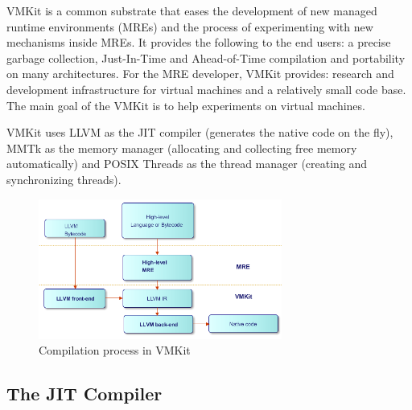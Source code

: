 

\label{sec:concurrency}
VMKit is a common substrate that eases the development of new managed runtime environments (MREs) and the process of experimenting with new mechanisms inside MREs.
It provides the following to the end users: a precise garbage collection, Just-In-Time and Ahead-of-Time compilation and portability on many architectures. For the MRE developer, VMKit provides: research and development infrastructure for virtual machines and a relatively small code base. The main goal of the VMKit is to help experiments on virtual machines.

VMKit uses  LLVM as the JIT compiler (generates the native code on the fly), MMTk as the memory manager (allocating and collecting free memory automatically) and POSIX Threads as the thread manager (creating and synchronizing threads).

\begin{figure}[ht!]
\centering
\includegraphics[width=80mm]{vmkitcompilation.png}
\caption{Compilation process in VMKit}
\label{fig:vmkitimplementation}
\end{figure}

\subsection{The JIT Compiler}

